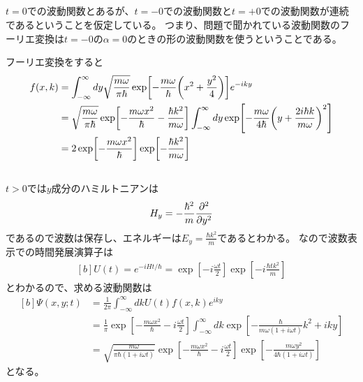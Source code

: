 \documentclass[../../sp_2016.tex]{subfiles}
\begin{document}
\subsection{}
\(t=0\)での波動関数とあるが、\(t=-0\)での波動関数と\(t=+0\)での波動関数が連続であるということを仮定している。
つまり、問題で聞かれている波動関数のフーリエ変換は\(t=-0\)の\(\alpha=0\)のときの形の波動関数を使うということである。

フーリエ変換をすると
\begin{equation}\begin{aligned}[b]
    f(x,k) &= \int_{-\infty}^{\infty}dy \sqrt{\frac{m\omega}{\pi\hbar}}\exp[-\frac{m\omega}{\hbar}\qty(x^2+\frac{y^2}{4})]e^{-iky}\\
    &=\sqrt{\frac{m\omega}{\pi\hbar}}\exp[-\frac{m\omega x^2}{\hbar}-\frac{\hbar k^2}{m\omega}]\int_{-\infty}^{\infty}dy\exp[-\frac{m\omega}{4\hbar}\qty(y+\frac{2i\hbar k}{m\omega})^2]\\
    &=2\exp[-\frac{m\omega x^2}{\hbar}]\exp[-\frac{\hbar k^2}{m\omega}]
\end{aligned}\end{equation}

\subsection{}
\(t>0\)では\(y\)成分のハミルトニアンは
\begin{equation}\begin{aligned}[b]
    H_y = -\frac{\hbar^2}{m}\pdv[2]{y}
\end{aligned}\end{equation}
であるので波数は保存し、エネルギーは\(E_y = \frac{\hbar k^2}{m}\)であるとわかる。
なので波数表示での時間発展演算子は
\begin{equation}\begin{aligned}[b]
    U(t) = e^{-iHt/\hbar} = \exp[-i\frac{\omega t}{2}]\exp[-i\frac{\hbar tk^2}{m}]
\end{aligned}\end{equation}
とわかるので、求める波動関数は
\begin{equation}\begin{aligned}[b]
    \Psi(x,y;t)
    &= \frac{1}{2\pi}\int_{-\infty}^{\infty}dk U(t)f(x,k)e^{iky}\\
    &= \frac{1}{\pi}\exp[-\frac{m\omega x^2}{\hbar}-i\frac{\omega t}{2}]
    \int_{-\infty}^{\infty}dk\exp[-\frac{\hbar}{m\omega(1+i\omega t)}k^2+iky]\\
    &=\sqrt{\frac{m\omega}{\pi\hbar(1+i\omega t)}}\exp[-\frac{m\omega x^2}{\hbar}-i\frac{\omega t}{2}]
    \exp[-\frac{m\omega y^2}{4\hbar(1+i\omega t)}]
\end{aligned}\end{equation}
となる。
\end{document}
